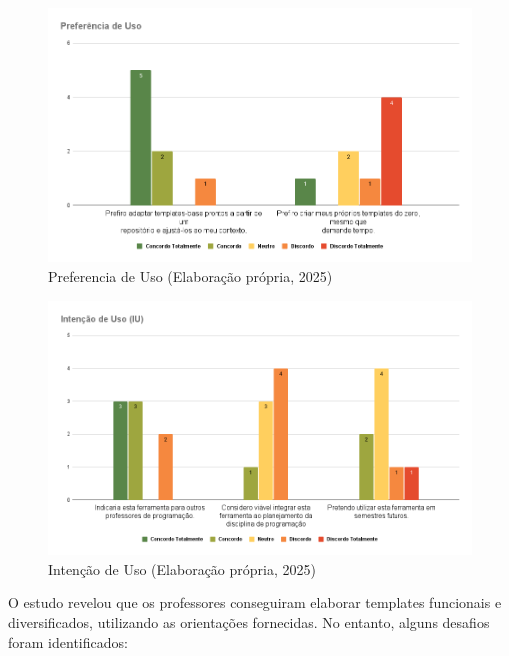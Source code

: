\begin{figure}[ht]
	\centering
	\includegraphics[width=16cm]{./imagens/capitulo8/preferencia-uso}
	\caption{Preferencia de Uso  (Elaboração própria, 2025) }
	\label{fig:preferencia-uso}
\end{figure}




\begin{figure}[ht]
	\centering
	\includegraphics[width=16cm]{./imagens/capitulo8/intencao-uso}
	\caption{Intenção de Uso  (Elaboração própria, 2025) }
	\label{fig:intencao-uso}
\end{figure}


O estudo revelou que os professores conseguiram elaborar templates funcionais e diversificados, utilizando as orientações fornecidas. No entanto, alguns desafios foram identificados:

